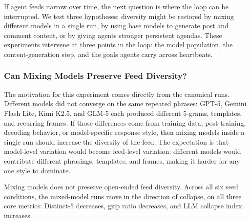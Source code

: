 \documentclass[11pt]{article}
\begin{document}
If agent feeds narrow over time, the next question is where the loop can be interrupted. We test three hypotheses: diversity might be restored by mixing different models in a single run, by using base models to generate post and comment content, or by giving agents stronger persistent agendas. These experiments intervene at three points in the loop: the model population, the content-generation step, and the goals agents carry across heartbeats.

\subsubsection{Can Mixing Models Preserve Feed Diversity?}
\label{subsubsec:mixing-models}

The motivation for this experiment comes directly from the canonical runs. Different models did not converge on the same repeated phrases: GPT-5, Gemini Flash Lite, Kimi K2.5, and GLM-5 each produced different 5-grams, templates, and recurring frames. If those differences come from training data, post-training, decoding behavior, or model-specific response style, then mixing models inside a single run should increase the diversity of the feed. The expectation is that model-level variation would become feed-level variation: different models would contribute different phrasings, templates, and frames, making it harder for any one style to dominate.

Mixing models does not preserve open-ended feed diversity. Across all six seed conditions, the mixed-model runs move in the direction of collapse, on all three core metrics: Distinct-5 decreases, gzip ratio decreases, and LLM collapse index increases.
\end{document}
